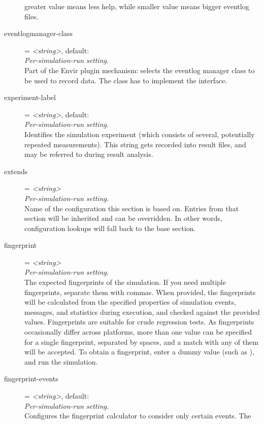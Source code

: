 \begin{description}
    greater value means less help, while smaller value means bigger eventlog
    files.
\item[eventlogmanager-class] = \textit{<string>}, default: \\
    \textit{Per-simulation-run setting.}\\
    Part of the Envir plugin mechanism: selects the eventlog manager class to
    be used to record data. The class has to implement the
     interface.
\item[experiment-label] = \textit{<string>}, default: \\
    \textit{Per-simulation-run setting.}\\
    Identifies the simulation experiment (which consists of several,
    potentially repeated measurements). This string gets recorded into result
    files, and may be referred to during result analysis.
\item[extends] = \textit{<string>}\\
    \textit{Per-simulation-run setting.}\\
    Name of the configuration this section is based on. Entries from that
    section will be inherited and can be overridden. In other words,
    configuration lookups will fall back to the base section.
\item[fingerprint] = \textit{<string>}\\
    \textit{Per-simulation-run setting.}\\
    The expected fingerprints of the simulation. If you need multiple
    fingerprints, separate them with commas. When provided, the fingerprints
    will be calculated from the specified properties of simulation events,
    messages, and statistics during execution, and checked against the provided
    values. Fingerprints are suitable for crude regression tests. As
    fingerprints occasionally differ across platforms, more than one value can
    be specified for a single fingerprint, separated by spaces, and a match
    with any of them will be accepted. To obtain a fingerprint, enter a dummy
    value (such as ), and run the simulation.
\item[fingerprint-events] = \textit{<string>}, default: \ttt{*}\\
    \textit{Per-simulation-run setting.}\\
    Configures the fingerprint calculator to consider only certain events. The

\end{description}
